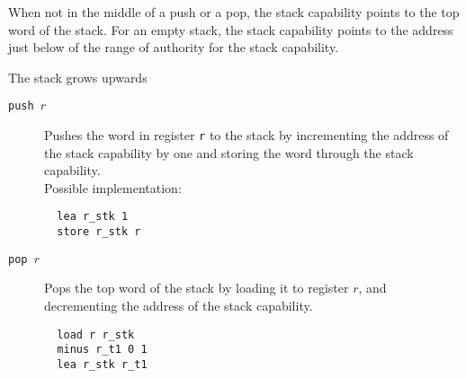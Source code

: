 \documentclass[a4paper]{article}
\begin{document}
When not in the middle of a push or a pop, the stack capability points to the top word of the stack. For an empty stack, the stack capability points to the address just below of the range of authority for the stack capability.

The stack grows upwards

\begin{description}
\item[\texttt{push $r$}] Pushes the word in register \texttt{r} to the stack by incrementing the address of the stack capability by one and storing the word through the stack capability.\\
Possible implementation:
\begin{lstlisting}
  lea r_stk 1
  store r_stk r
\end{lstlisting}

\item[\texttt{pop $r$}] Pops the top word of the stack by loading it to register $r$, and decrementing the address of the stack capability.
\begin{lstlisting}
  load r r_stk
  minus r_t1 0 1
  lea r_stk r_t1
\end{lstlisting}


\end{description}
\end{document}
